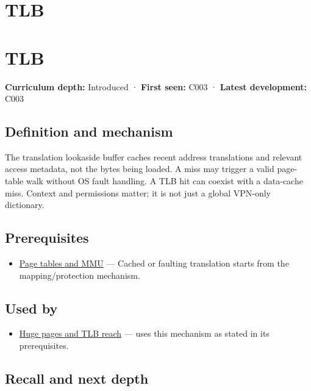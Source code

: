 \hypertarget{appendix-7a2d9c5ce511}{}
\section*{TLB}
\section{TLB}\label{tlb}

\textbf{Curriculum depth:} Introduced · \textbf{First seen:} C003 · \textbf{Latest development:} C003

\subsection{Definition and mechanism}\label{definition-and-mechanism}

The translation lookaside buffer caches recent address translations and relevant access metadata, not the bytes being loaded. A miss may trigger a valid page-table walk without OS fault handling. A TLB hit can coexist with a data-cache miss. Context and permissions matter; it is not just a global VPN-only dictionary.

\subsection{Prerequisites}\label{prerequisites}

\begin{itemize}
\tightlist
\item
  \hyperref[appendix-01e5905165c4]{Page tables and MMU} --- Cached or faulting translation starts from the mapping/protection mechanism.
\end{itemize}

\subsection{Used by}\label{used-by}

\begin{itemize}
\tightlist
\item
  \hyperref[appendix-ce688d1acdab]{Huge pages and TLB reach} --- uses this mechanism as stated in its prerequisites.
\end{itemize}

\subsection{Recall and next depth}\label{recall-and-next-depth}

